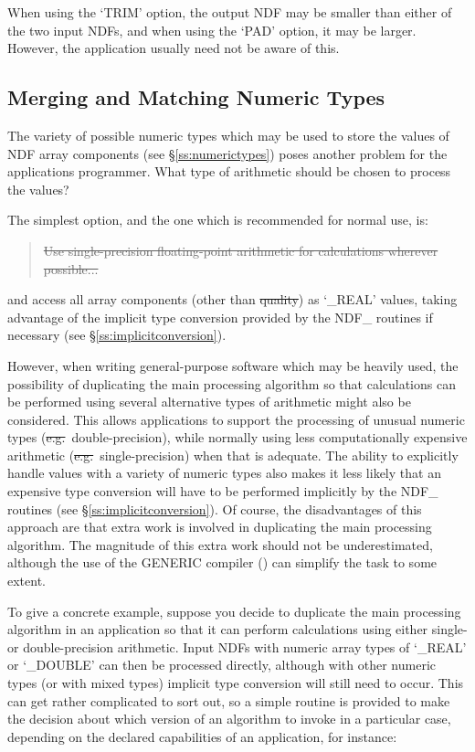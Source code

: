 When using the `TRIM' option, the output NDF may be smaller than either of
the two input NDFs, and when using the `PAD' option, it may be larger. 
However, the application usually need not be aware of this. 

\subsection{Merging and Matching Numeric Types}

The variety of possible numeric types which may be used to store the values
of NDF array components (see \S\ref{ss:numerictypes}) poses another problem
for the applications programmer. 
What type of arithmetic should be chosen to process the values?

The simplest option, and the one which is recommended for normal use, is:

\begin{quote}
\begin{center}
\st{Use single-precision floating-point arithmetic for calculations
wherever possible...} 
\end{center}
\end{quote}

and access all array components (other than \st{quality\/}) as `\_REAL'
values, taking advantage of the implicit type conversion provided by the
NDF\_ routines if necessary (see \S\ref{ss:implicitconversion}). 

However, when writing general-purpose software which may be heavily used,
the possibility of duplicating the main processing algorithm so that
calculations can be performed using several alternative types of arithmetic
might also be considered. 
This allows applications to support the processing of unusual numeric types
(\st{e.g.}\ double-precision), while normally using less computationally
expensive arithmetic (\st{e.g.}\ single-precision) when that is adequate. 
The ability to explicitly handle values with a variety of numeric types also
makes it less likely that an expensive type conversion will have to be
performed implicitly by the NDF\_ routines (see
\S\ref{ss:implicitconversion}). 
Of course, the disadvantages of this approach are that extra work is
involved in duplicating the main processing algorithm. 
The magnitude of this extra work should not be underestimated, although the
use of the GENERIC compiler () can simplify the
task to some extent.

To give a concrete example, suppose you decide to duplicate the main
processing algorithm in an application so that it can perform calculations
using either single- or double-precision arithmetic. 
Input NDFs with numeric array types of `\_REAL' or `\_DOUBLE' can then be
processed directly, although with other numeric types (or with mixed types)
implicit type conversion will still need to occur. 
This can get rather complicated to sort out, so a simple routine 
is provided to make the decision about which version of an algorithm to
invoke in a particular case, depending on the declared capabilities of an
application, for instance:

